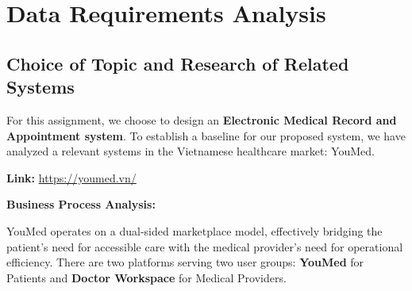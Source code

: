 \section{Data Requirements Analysis}

\subsection{Choice of Topic and Research of Related Systems}
For this assignment, we choose to design an \textbf{Electronic Medical Record and Appointment system}. To establish a baseline for our proposed system, we have analyzed a relevant systems in the Vietnamese healthcare market: YouMed.

\textbf{Link:} \url{https://youmed.vn/} \par
\textbf{Business Process Analysis:} \par
YouMed operates on a dual-sided marketplace model, effectively bridging the patient's need for accessible care with the medical provider's need for operational efficiency. There are two platforms serving two user groups: \textbf{YouMed} for Patients and \textbf{Doctor Workspace} for Medical Providers.
